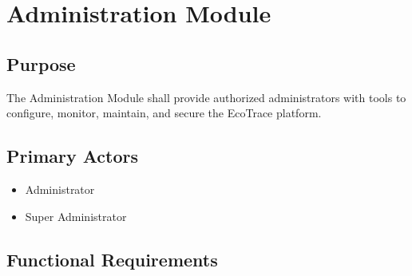 \section{Administration Module}
\label{sec:administration}

\subsection{Purpose}

The Administration Module shall provide authorized administrators with
tools to configure, monitor, maintain, and secure the EcoTrace
platform.

\subsection{Primary Actors}

\begin{itemize}
\item Administrator
\item Super Administrator
\end{itemize}

\subsection{Functional Requirements}

